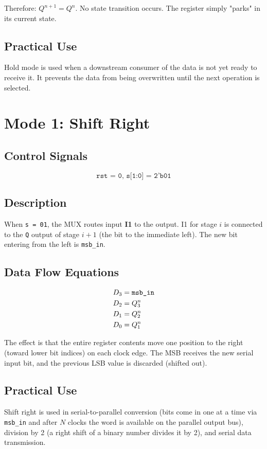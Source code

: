 \documentclass[12pt,a4paper]{report}
\newcommand{\signal}[1]{\texttt{\textcolor{codeblue}{#1}}}
\begin{document}
Therefore: $Q^{n+1} = Q^n$. No state transition occurs. The register simply "parks" in its current state.

\subsection{Practical Use}
Hold mode is used when a downstream consumer of the data is not yet ready to receive it. It prevents the data from being overwritten until the next operation is selected.

\section{Mode 1: Shift Right}

\subsection{Control Signals}
\[\texttt{rst = 0, s[1:0] = 2'b01}\]

\subsection{Description}
When \signal{s = 01}, the MUX routes input \textbf{I1} to the output. I1 for stage $i$ is connected to the \signal{Q} output of stage $i+1$ (the bit to the immediate left). The new bit entering from the left is \signal{msb\_in}.

\subsection{Data Flow Equations}
\begin{align}
    D_3 &= \texttt{msb\_in} \notag \\
    D_2 &= Q_3^n \notag \\
    D_1 &= Q_2^n \notag \\
    D_0 &= Q_1^n \notag
\end{align}

The effect is that the entire register contents move one position to the right (toward lower bit indices) on each clock edge. The MSB receives the new serial input bit, and the previous LSB value is discarded (shifted out).

\subsection{Practical Use}
Shift right is used in serial-to-parallel conversion (bits come in one at a time via \signal{msb\_in} and after $N$ clocks the word is available on the parallel output bus), division by 2 (a right shift of a binary number divides it by 2), and serial data transmission.
\end{document}
